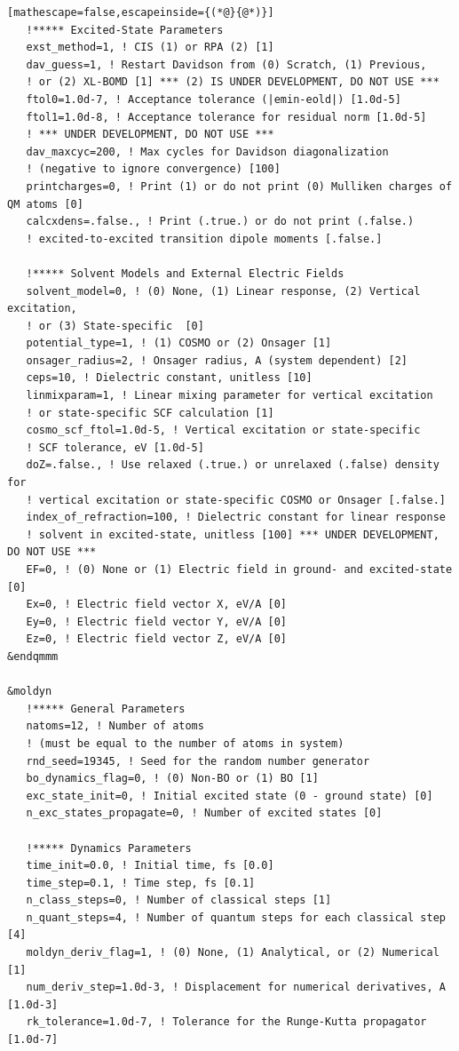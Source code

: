 \documentclass[letterpaper,12pt,titlepage]{article}
\begin{document}
\begin{appendix}
\begin{lstlisting}[mathescape=false,escapeinside={(*@}{@*)}]
   !***** Excited-State Parameters
   exst_method=1, ! CIS (1) or RPA (2) [1]
   dav_guess=1, ! Restart Davidson from (0) Scratch, (1) Previous, 
   ! or (2) XL-BOMD [1] *** (2) IS UNDER DEVELOPMENT, DO NOT USE ***
   ftol0=1.0d-7, ! Acceptance tolerance (|emin-eold|) [1.0d-5]
   ftol1=1.0d-8, ! Acceptance tolerance for residual norm [1.0d-5] 
   ! *** UNDER DEVELOPMENT, DO NOT USE ***
   dav_maxcyc=200, ! Max cycles for Davidson diagonalization 
   ! (negative to ignore convergence) [100]
   printcharges=0, ! Print (1) or do not print (0) Mulliken charges of QM atoms [0]
   calcxdens=.false., ! Print (.true.) or do not print (.false.) 
   ! excited-to-excited transition dipole moments [.false.]

   !***** Solvent Models and External Electric Fields
   solvent_model=0, ! (0) None, (1) Linear response, (2) Vertical excitation, 
   ! or (3) State-specific  [0]
   potential_type=1, ! (1) COSMO or (2) Onsager [1]
   onsager_radius=2, ! Onsager radius, A (system dependent) [2]
   ceps=10, ! Dielectric constant, unitless [10]
   linmixparam=1, ! Linear mixing parameter for vertical excitation
   ! or state-specific SCF calculation [1]
   cosmo_scf_ftol=1.0d-5, ! Vertical excitation or state-specific
   ! SCF tolerance, eV [1.0d-5]
   doZ=.false., ! Use relaxed (.true.) or unrelaxed (.false) density for 
   ! vertical excitation or state-specific COSMO or Onsager [.false.]
   index_of_refraction=100, ! Dielectric constant for linear response 
   ! solvent in excited-state, unitless [100] *** UNDER DEVELOPMENT, DO NOT USE ***
   EF=0, ! (0) None or (1) Electric field in ground- and excited-state [0]
   Ex=0, ! Electric field vector X, eV/A [0]
   Ey=0, ! Electric field vector Y, eV/A [0]
   Ez=0, ! Electric field vector Z, eV/A [0] 
&endqmmm

&moldyn
   !***** General Parameters
   natoms=12, ! Number of atoms 
   ! (must be equal to the number of atoms in system)
   rnd_seed=19345, ! Seed for the random number generator
   bo_dynamics_flag=0, ! (0) Non-BO or (1) BO [1]
   exc_state_init=0, ! Initial excited state (0 - ground state) [0]
   n_exc_states_propagate=0, ! Number of excited states [0]

   !***** Dynamics Parameters
   time_init=0.0, ! Initial time, fs [0.0]
   time_step=0.1, ! Time step, fs [0.1]
   n_class_steps=0, ! Number of classical steps [1]
   n_quant_steps=4, ! Number of quantum steps for each classical step [4]
   moldyn_deriv_flag=1, ! (0) None, (1) Analytical, or (2) Numerical [1]
   num_deriv_step=1.0d-3, ! Displacement for numerical derivatives, A [1.0d-3]
   rk_tolerance=1.0d-7, ! Tolerance for the Runge-Kutta propagator [1.0d-7]


\end{lstlisting}
\end{appendix}
\end{document}
